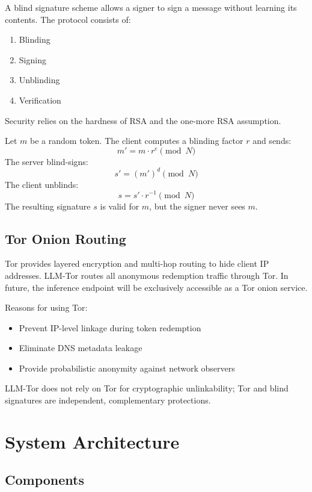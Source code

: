 \documentclass[11pt,a4paper]{article}
\begin{document}
A blind signature scheme allows a signer to sign a message without learning its contents. The protocol
consists of:
\begin{enumerate}
  \item Blinding
  \item Signing
  \item Unblinding
  \item Verification
\end{enumerate}

Security relies on the hardness of RSA and the one-more RSA assumption.

Let $m$ be a random token. The client computes a blinding factor $r$ and sends:
\[
  m' = m \cdot r^e \pmod{N}
\]
The server blind-signs:
\[
  s' = (m')^d \pmod{N}
\]
The client unblinds:
\[
  s = s' \cdot r^{-1} \pmod{N}
\]
The resulting signature $s$ is valid for $m$, but the signer never sees $m$.

\subsection{Tor Onion Routing}

Tor provides layered encryption and multi-hop routing to hide client IP addresses. LLM-Tor routes all
anonymous redemption traffic through Tor. In future, the inference endpoint will be exclusively accessible
as a Tor onion service.

Reasons for using Tor:
\begin{itemize}
  \item Prevent IP-level linkage during token redemption
  \item Eliminate DNS metadata leakage
  \item Provide probabilistic anonymity against network observers
\end{itemize}

LLM-Tor does not rely on Tor for cryptographic unlinkability; Tor and blind signatures are independent,
complementary protections.

\section{System Architecture}

\subsection{Components}
\end{document}
